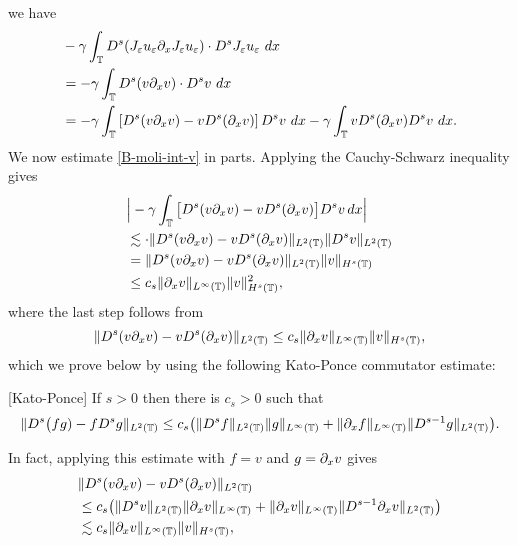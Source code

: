%
%
we have
%
\begin{equation} 
\begin{split}
\label{B-moli-int-v}
& -  \gamma \int_{\mathbb{T}}   D^s (J_{\varepsilon} u_{\varepsilon} \partial_x J_\varepsilon u_\varepsilon)
\cdot D^s
J_{\varepsilon}u_\varepsilon \ dx  
\\
& = - \gamma \int_{\mathbb{T}}
D^s(v \partial_x v) \cdot   D^s v \ dx
\\
& = - \gamma \int_{\mathbb{T}}
\left [ 
D^s(v\partial_x v)  -  v D^s (\partial_xv)
\right ] 
D^s v \ dx - \gamma \int_{\mathbb{T}}
v D^s (\partial_xv)
D^s v \ dx.
\end{split}
\end{equation}
%
%
%
We now estimate \eqref{B-moli-int-v} in parts. Applying the Cauchy-Schwarz inequality gives
%
\begin{equation} 
\label{int1-est-calc2}
\begin{split}
& \Big|
- \gamma \int_{\mathbb{T}}
\big[ 
D^s(v\partial_x v)  -  v D^s (\partial_xv)
\big]
D^s v   \, dx
\Big|
\\
& \lesssim
\cdot \|
D^s(v\partial_x v)  -  v D^s (\partial_xv)
\|_{L^2(\mathbb{T})}
\|
D^s v 
\|_{L^2(\mathbb{T})}
\\
& = 
  \|
D^s(v\partial_x v)  -  v D^s (\partial_xv)
\|_{L^2(\mathbb{T})}
\|
v
\|_{H^s(\mathbb{T})}
\\
&\le c_s \| \partial_x v \|_{L^\infty(\mathbb{T})} 
\| v \|_{H^s(\mathbb{T})}^2,
\end{split}
\end{equation}
%
where the last step follows from 
%
\begin{equation} 
\label{int1-est-calc3}
\| D^s(v\partial_x v)  -  v D^s (\partial_xv) \|_{L^2(\mathbb{T})}
\le
c_s    \| \partial_x v \|_{L^\infty(\mathbb{T})} 
\| v \|_{H^s(\mathbb{T})},
\end{equation}
which we prove below by using the following Kato-Ponce commutator 
estimate:  
\begin{lemma} 
\label{KP-lemma}
[Kato-Ponce]
If  $s>0$ then there is $c_s>0$ such that 
%
\begin{equation} 
\label{KP-com-est}
\| D^{s} \big(fg) -  f D^s g\|_{L^2(\mathbb{T})}
\le
c_s\big(
\| D^{s}f \|_{L^2(\mathbb{T})}    \| g \|_{L^\infty(\mathbb{T})} 
+
\| \partial_xf \|_{L^\infty(\mathbb{T})}    \| D^{s-1}g \|_{L^2(\mathbb{T})}   
\big).
\end{equation}
%
\end{lemma}
%
%
In fact, applying  this estimate with $f=v$ and $g=\partial_xv$ gives 
%
\begin{equation} 
\label{int1-est-calc4}
\begin{split}
& \| D^s(v\partial_x v)  -  v D^s (\partial_xv) \|_{L^2(\mathbb{T})}
\\
& \le
{c_s} \big(
\| D^{s}v \|_{L^2(\mathbb{T})}    \| \partial_x v \|_{L^\infty(\mathbb{T})} 
+
\| \partial_xv \|_{L^\infty(\mathbb{T})}    \| D^{s-1}\partial_x v \|_{L^2(\mathbb{T})}   
\big)
\\
& \lesssim {c_s}    \| \partial_x v \|_{L^\infty(\mathbb{T})} 
\| v \|_{H^s(\mathbb{T})}, 
\end{split}
\end{equation}
